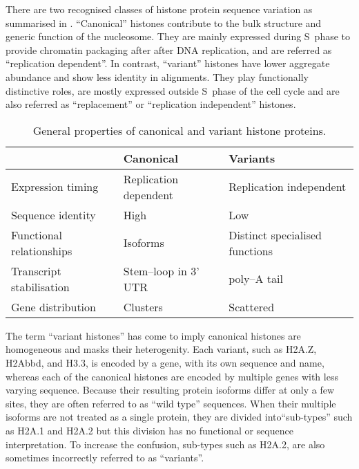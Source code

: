   There are two recognised classes of histone protein sequence variation as summarised
  in . ``Canonical'' histones contribute to the
  bulk structure and generic function of the nucleosome. They are mainly expressed
  during S~phase to provide chromatin packaging after after DNA replication,
  and are referred as ``replication dependent''. In contrast, ``variant'' histones
  have lower aggregate abundance and show less identity in alignments. They play
  functionally distinctive roles, are mostly expressed outside S~phase of the cell
  cycle and are also referred as ``replacement'' or ``replication independent'' histones.

  \begin{table*}
    \caption{General properties of canonical and variant histone proteins.}
    \label{tab:typical-histone-differences}
    \centering
    \begin{tabular}{l l l}
      \toprule
      \null                     & Canonical             & Variants \\
      \midrule
      Expression timing         & Replication dependent & Replication independent \\
      Sequence identity         & High                  & Low \\
      Functional relationships  & Isoforms              & Distinct specialised functions \\
      Transcript stabilisation  & Stem--loop in 3' UTR  & poly--A tail \\
      Gene distribution         & Clusters              & Scattered \\
      \bottomrule
    \end{tabular}
  \end{table*}

  The term ``variant histones'' has come to imply canonical histones are homogeneous
  and masks their heterogenity. Each variant, such as H2A.Z, H2Abbd, and H3.3,
  is encoded by a gene, with its own sequence and name,
  whereas each of the canonical histones are encoded by multiple genes
  with less varying sequence.
  Because their resulting protein isoforms differ at only a few sites, they are often
  referred to as ``wild type'' sequences.
  When their multiple isoforms are not treated as a single protein, they are divided
  into``sub-types'' such as H2A.1 and H2A.2 but this division has no functional or sequence
  interpretation. To increase the confusion, sub-types such as H2A.2, are also sometimes incorrectly
  referred to as ``variants''.

